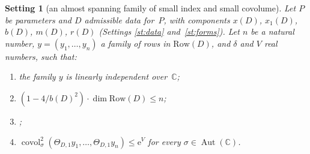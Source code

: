 \documentclass[11pt,a4paper]{article}
\theoremstyle{plainx}
\theoremstyle{uprightx}
\newtheorem{setting}[theorem]{Setting}          %
\newcommand{\C}{\mathbb{C}}
\newcommand{\ee}{\mathrm{e}}
\newcommand{\AutC}{\operatorname{Aut}(\C)}
\newcommand{\scx}[1]{x(#1)}
\newcommand{\scxo}[1]{x_1(#1)}
\newcommand{\scb}[1]{b(#1)}
\newcommand{\Dm}[1]{m(#1)}
\newcommand{\Dr}[1]{r(#1)}
\newcommand{\Row}[1]{\mathrm{Row}(#1)}
\newcommand{\Th}[2]{\Theta_{#1,#2}}
\newcommand{\covol}[2]{\operatorname{covol}^{2}_{#2}(#1)}
\begin{document}
\begin{setting}[an almost spanning family of small index and small covolume]\label{st:family}
Let $P$ be parameters and $D$ admissible data for~$P$, with components $\scx{D}$, $\scxo{D}$, $\scb{D}$, $\Dm{D}$, $\Dr{D}$ (Settings
\ref{st:data} and~\ref{st:forms}). Let $n$ be a natural number, $y=(y_1,\dots,y_n)$ a family of rows in $\Row{D}$,
and $\delta$ and $V$ real numbers, such that:
\begin{enumerate}[label=(\roman*)]
\item the family $y$ is linearly independent over~$\C$;
\item $(1-4/\scb{D}^{2})\cdot\dim\Row{D}\le n$;
\item {};
\item $\covol{\Th{D}{1}y_1,\dots,\Th{D}{1}y_n}{\sigma}\le\ee^{V}$ for every $\sigma\in\AutC$.
\end{enumerate}
\end{setting}
\end{document}
